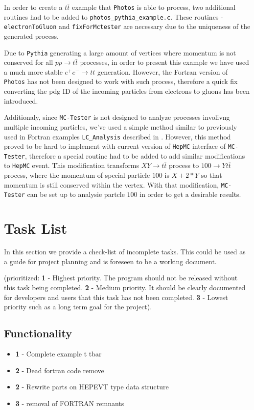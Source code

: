 \documentclass[]{Photos_interface_design}
\begin{document}
In order to create a $t \bar t$ example that {\tt Photos} is able to process,
two additional routines had to be added to {\tt photos\_pythia\_example.c}.
These routines - {\tt electronToGluon} and {\tt fixForMctester} are necessary
due to the uniqueness of the generated process.

Due to {\tt Pythia} generating a large amount of vertices where momentum is not
conserved for all $p p \rightarrow t \bar t$ processes, in order to present this
example we have used a much more stable $e^+ e^- \rightarrow t \bar t$
generation. However, the Fortran version of {\tt Photos} has not been designed
to work with such process, therefore a quick fix converting the pdg ID of
the incoming particles from electrons to gluons has been introduced.

Additionaly, since {\tt MC-Tester} is not designed to analyze processes involivng
multiple incoming particles, we've used a simple method similar to previously
used in Fortran examples {\tt LC\_Analysis} described in \cite{??}. However,
this method proved to be hard to implement with current version of {\tt HepMC}
interface of {\tt MC-Tester}, therefore a special routine had to be added
to add similar modifications to {\tt HepMC} event. This modification transforms
$X Y \rightarrow t \bar t$ process to $100 \rightarrow Y t \bar t$ process,
where the momentum of special particle $100$ is $X + 2*Y$ so that momentum is still
conserved within the vertex. With that modification, {\tt MC-Tester} can be set up
to analysie partcle $100$ in order to get a desirable results.

\newpage

\section*{Task List}
In this section we provide a check-list of incomplete tasks.
This could be used as a guide for project planning and is foreseen
to be a working document. 

(prioritized: {\bf 1} - Highest priority. The program should not be
released without this task being completed. {\bf 2} - Medium priority.
It should be clearly documented for developers and users that this task has not
been completed. {\bf 3} - Lowest priority such as a long term goal 
for the project).

\subsection*{Functionality}
\begin{itemize}
  \item[\ding{111}]{\bf 1} - Complete example t tbar
  \item[\ding{111}]{\bf 2} - Dead fortran code remove
  \item[\ding{111}]{\bf 2} - Rewrite parts on HEPEVT type data structure
  \item[\ding{111}]{\bf 3} - removal of FORTRAN remnants
\end{itemize}
\end{document}
